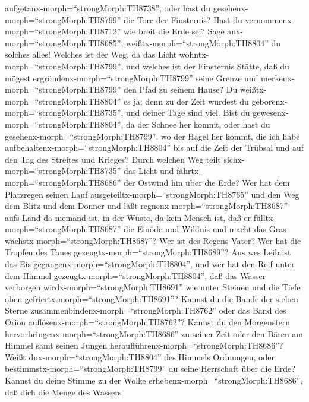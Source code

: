 aufgetanx-morph=``strongMorph:TH8738'', oder hast du
gesehenx-morph=``strongMorph:TH8799'' die Tore der Finsternis?
 Hast du vernommenx-morph=``strongMorph:TH8712'' wie breit
die Erde sei? Sage anx-morph=``strongMorph:TH8685'',
weißtx-morph=``strongMorph:TH8804'' du solches alles! 
Welches ist der Weg, da das Licht wohntx-morph=``strongMorph:TH8799'',
und welches ist der Finsternis Stätte,  daß du mögest
ergründenx-morph=``strongMorph:TH8799'' seine Grenze und
merkenx-morph=``strongMorph:TH8799'' den Pfad zu seinem Hause?
 Du weißtx-morph=``strongMorph:TH8804'' es ja; denn zu der
Zeit wurdest du geborenx-morph=``strongMorph:TH8735'', und deiner Tage
sind viel.  Bist du gewesenx-morph=``strongMorph:TH8804'',
da der Schnee her kommt, oder hast du
gesehenx-morph=``strongMorph:TH8799'', wo der Hagel her kommt,
 die ich habe aufbehaltenx-morph=``strongMorph:TH8804'' bis
auf die Zeit der Trübsal und auf den Tag des Streites und Krieges?
 Durch welchen Weg teilt sichx-morph=``strongMorph:TH8735''
das Licht und fährtx-morph=``strongMorph:TH8686'' der Ostwind hin über
die Erde?  Wer hat dem Platzregen seinen Lauf
ausgeteiltx-morph=``strongMorph:TH8765'' und den Weg dem Blitz und dem
Donner  und läßt regnenx-morph=``strongMorph:TH8687'' aufs
Land da niemand ist, in der Wüste, da kein Mensch ist,  daß
er fülltx-morph=``strongMorph:TH8687'' die Einöde und Wildnis und macht
das Gras wächstx-morph=``strongMorph:TH8687''?  Wer ist des
Regens Vater? Wer hat die Tropfen des Taues
gezeugtx-morph=``strongMorph:TH8689''?  Aus wes Leib ist
das Eis gegangenx-morph=``strongMorph:TH8804'', und wer hat den Reif
unter dem Himmel gezeugtx-morph=``strongMorph:TH8804'', 
daß das Wasser verborgen wirdx-morph=``strongMorph:TH8691'' wie unter
Steinen und die Tiefe oben gefriertx-morph=``strongMorph:TH8691''?
 Kannst du die Bande der sieben Sterne
zusammenbindenx-morph=``strongMorph:TH8762'' oder das Band des Orion
auflösenx-morph=``strongMorph:TH8762''?  Kannst du den
Morgenstern hervorbringenx-morph=``strongMorph:TH8686'' zu seiner Zeit
oder den Bären am Himmel samt seinen Jungen
heraufführenx-morph=``strongMorph:TH8686''?  Weißt
dux-morph=``strongMorph:TH8804'' des Himmels Ordnungen, oder
bestimmstx-morph=``strongMorph:TH8799'' du seine Herrschaft über die
Erde?  Kannst du deine Stimme zu der Wolke
erhebenx-morph=``strongMorph:TH8686'', daß dich die Menge des Wassers
